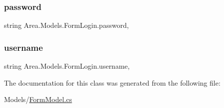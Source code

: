 \subsubsection{\texorpdfstring{password}{password}}
{\footnotesize\ttfamily string Area.\+Models.\+Form\+Login.\+password\hspace{0.3cm}{\ttfamily [get]}, {\ttfamily [set]}}

\mbox{\label{classArea_1_1Models_1_1FormLogin_a4702f49df99650fe317cf8e02b721921}} 
\subsubsection{\texorpdfstring{username}{username}}
{\footnotesize\ttfamily string Area.\+Models.\+Form\+Login.\+username\hspace{0.3cm}{\ttfamily [get]}, {\ttfamily [set]}}



The documentation for this class was generated from the following file\+:\begin{DoxyCompactItemize}
\item 
Models/\mbox{\hyperlink{FormModel_8cs}{Form\+Model.\+cs}}\end{DoxyCompactItemize}
